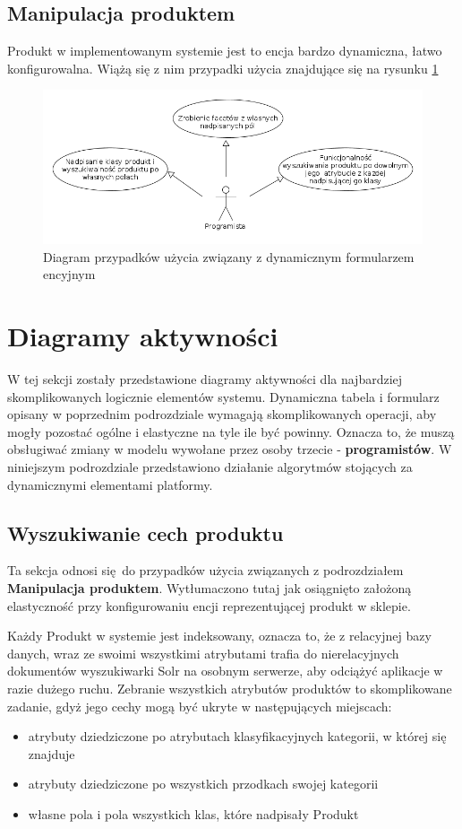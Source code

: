 \subsection{Manipulacja produktem}
Produkt w implementowanym systemie jest to encja bardzo dynamiczna, łatwo konfigurowalna. Wiążą się z nim przypadki użycia znajdujące się na rysunku \ref{manipProd}
\begin{figure}[H]
	\begin{center}
		\includegraphics[scale=0.5]{manipProd.png}
	\end{center}
	\caption{{\color{black}Diagram przypadków użycia związany z dynamicznym formularzem encyjnym}} \label{manipProd}
\end{figure}

\section{Diagramy aktywności}
W tej sekcji zostały przedstawione diagramy aktywności dla najbardziej skomplikowanych logicznie elementów systemu. Dynamiczna tabela i formularz opisany w poprzednim podrozdziale wymagają skomplikowanych operacji, aby mogły pozostać ogólne i elastyczne na tyle ile być powinny. Oznacza to, że muszą obsługiwać zmiany w modelu wywołane przez osoby trzecie - \textbf{programistów}. W niniejszym podrozdziale przedstawiono działanie algorytmów stojących za dynamicznymi elementami platformy.

\subsection{Wyszukiwanie cech produktu}
Ta sekcja odnosi się do przypadków użycia związanych z podrozdziałem \textbf{Manipulacja produktem}. Wytłumaczono tutaj jak osiągnięto założoną elastyczność przy konfigurowaniu encji reprezentującej produkt w sklepie. 

Każdy Produkt w systemie jest indeksowany, oznacza to, że z relacyjnej bazy danych, wraz ze swoimi wszystkimi atrybutami trafia do nierelacyjnych dokumentów wyszukiwarki Solr na osobnym serwerze, aby odciążyć aplikacje w razie dużego ruchu. Zebranie wszystkich atrybutów produktów to skomplikowane zadanie, gdyż jego cechy mogą być ukryte w następujących miejscach: 
\begin{itemize}
	\item atrybuty dziedziczone po atrybutach klasyfikacyjnych kategorii, w której się znajduje
	\item atrybuty dziedziczone po wszystkich przodkach swojej kategorii
	\item własne pola i pola wszystkich klas, które nadpisały Produkt 
\end{itemize}  

